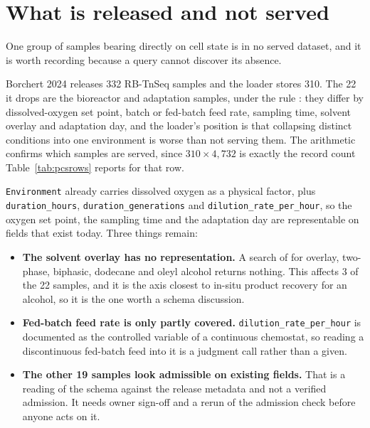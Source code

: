 
\section{What is released and not served}\label{sec:gaps}

One group of samples bearing directly on cell state is in no served dataset, and it is
worth recording because a query cannot discover its absence.

 Borchert 2024 releases 332 RB-TnSeq samples and the
loader stores 310. The 22 it drops are the bioreactor and adaptation samples, under the
rule : they differ by dissolved-oxygen set
point, batch or fed-batch feed rate, sampling time, solvent overlay and adaptation day,
and the loader's position is that collapsing distinct conditions into one environment
is worse than not serving them. The arithmetic confirms which samples are served, since
$310 \times 4{,}732$ is exactly the record count Table~\ref{tab:pcsrows} reports for
that row.

 \texttt{Environment} already
carries dissolved oxygen as a physical factor, plus \texttt{duration\_hours},
\texttt{duration\_generations} and \texttt{dilution\_rate\_per\_hour}, so the oxygen set
point, the sampling time and the adaptation day are representable on fields that exist
today. Three things remain:

\begin{itemize}[nosep,leftmargin=1.4em]
\item \textbf{The solvent overlay has no representation.} A search of
 for overlay, two-phase, biphasic, dodecane and
oleyl alcohol returns nothing. This affects 3 of the 22 samples, and it is the axis
closest to in-situ product recovery for an alcohol, so it is the one worth a schema
discussion.
\item \textbf{Fed-batch feed rate is only partly covered.}
\texttt{dilution\_rate\_per\_hour} is documented as the controlled variable of a
continuous chemostat, so reading a discontinuous fed-batch feed into it is a judgment
call rather than a given.
\item \textbf{The other 19 samples look admissible on existing fields.} That is a
reading of the schema against the release metadata and not a verified admission. It
needs owner sign-off and a rerun of the admission check before anyone acts on it.
\end{itemize}

